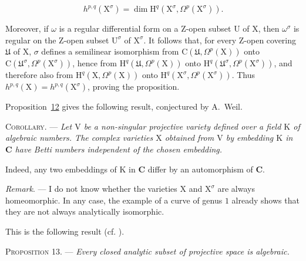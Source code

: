 \begin{equation*}
h^{p,q}(\mathrm{X}^\sigma)=
\dim\mathrm{H}^q(\mathrm{X}^\sigma,\Omega^p(\mathrm{X}^\sigma)).
\end{equation*}

Moreover, if $\omega$ is a regular differential form on a Z-open subset $\mathrm{U}$
of $\mathrm{X}$, then $\omega^\sigma$ is regular on the Z-open subset $\mathrm{U}^\sigma$ of
$\mathrm{X}^\sigma$. It follows that, for every Z-open covering $\mathfrak{U}$ of $\mathrm{X}$,
$\sigma$ defines a semilinear isomorphism from
$\mathrm{C}(\mathfrak{U},\Omega^p(\mathrm{X}))$ onto
$\mathrm{C}(\mathfrak{U}^\sigma,\Omega^p(\mathrm{X}^\sigma))$, hence from
$\mathrm{H}^q(\mathfrak{U},\Omega^p(\mathrm{X}))$ onto
$\mathrm{H}^q(\mathfrak{U}^\sigma,\Omega^p(\mathrm{X}^\sigma))$, and therefore also
from $\mathrm{H}^q(\mathrm{X},\Omega^p(\mathrm{X}))$ onto
$\mathrm{H}^q(\mathrm{X}^\sigma,\Omega^p(\mathrm{X}^\sigma))$. Thus
$h^{p,q}(\mathrm{X})=h^{p,q}(\mathrm{X}^\sigma)$, proving the proposition.

Proposition~\hyperref[gaga:prop:12]{12} gives the following result, conjectured
by A.~Weil.

\textsc{Corollary}. --- \emph{Let $\mathrm{V}$ be a
non-singular projective variety defined over a field $\mathrm{K}$ of algebraic numbers.
The complex varieties $\mathrm{X}$ obtained from $\mathrm{V}$ by embedding $\mathrm{K}$ in $\mathbf{C}$
have Betti numbers independent of the chosen embedding.}

Indeed, any two embeddings of $\mathrm{K}$ in $\mathbf{C}$ differ by an automorphism of
$\mathbf{C}$.

\emph{Remark}. --- I do not know whether the
varieties $\mathrm{X}$ and $\mathrm{X}^\sigma$ are always homeomorphic. In any case, the example
of a curve of genus $1$ already shows that they are not always analytically
isomorphic.


This is the following result (cf. ).

\textsc{Proposition 13}. --- \emph{Every closed
analytic subset of projective space is algebraic.}

